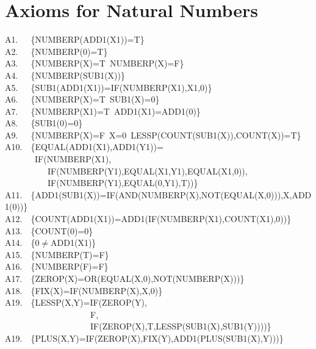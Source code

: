 \documentclass[11pt]{book}
\newenvironment{pubasis}{\begin{flushleft}\ttfamily\small}{\normalsize\rmfamily\end{flushleft}}
\newcommand{\pubdefaulttextsize}{\large}
\begin{document}
\section{Axioms for Natural Numbers}
\pubdefaulttextsize
\begin{pubasis}
A1.~~~\{NUMBERP(ADD1(X1))=T\}\\

A2.~~~\{NUMBERP(0)=T\}\\

A3.~~~\{NUMBERP(X)=T~NUMBERP(X)=F\}\\

A4.~~~\{NUMBERP(SUB1(X))\}\\

A5.~~~\{SUB1(ADD1(X1))=IF(NUMBERP(X1),X1,0)\}\\

A6.~~~\{NUMBERP(X)=T~SUB1(X)=0\}\\

A7.~~~\{NUMBERP(X1)=T~ADD1(X1)=ADD1(0)\}\\

A8.~~~\{SUB1(0)=0\}\\

A9.~~~\{NUMBERP(X)=F~X=0~LESSP(COUNT(SUB1(X)),COUNT(X))=T\}\\

A10.~~\{EQUAL(ADD1(X1),ADD1(Y1))=\\
~~~~~~~IF(NUMBERP(X1),\\
~~~~~~~~~~IF(NUMBERP(Y1),EQUAL(X1,Y1),EQUAL(X1,0)),\\
~~~~~~~~~~IF(NUMBERP(Y1),EQUAL(0,Y1),T))\}\\

A11.~~\{ADD1(SUB1(X))=IF(AND(NUMBERP(X),NOT(EQUAL(X,0))),X,ADD1(0))\}\\

A12.~~\{COUNT(ADD1(X1))=ADD1(IF(NUMBERP(X1),COUNT(X1),0))\}\\

A13.~~\{COUNT(0)=0\}\\

A14.~~\{0$\neq$ADD1(X1)\}\\

A15.~~\{NUMBERP(T)=F\}\\

A16.~~\{NUMBERP(F)=F\}\\

A17.~~\{ZEROP(X)=OR(EQUAL(X,0),NOT(NUMBERP(X)))\}\\

A18.~~\{FIX(X)=IF(NUMBERP(X),X,0)\}\\

A19.~~\{LESSP(X,Y)=IF(ZEROP(Y),\\
~~~~~~~~~~~~~~~~~~~~F,\\
~~~~~~~~~~~~~~~~~~~~IF(ZEROP(X),T,LESSP(SUB1(X),SUB1(Y))))\}\\

A19.~~\{PLUS(X,Y)=IF(ZEROP(X),FIX(Y),ADD1(PLUS(SUB1(X),Y)))\}\\
\end{pubasis}
\end{document}
